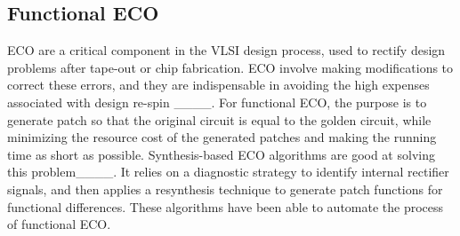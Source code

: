 \subsection{Functional ECO}
ECO are a critical component in the VLSI design process, used to rectify design problems after tape-out or chip fabrication. ECO involve making modifications to correct these errors, and they are indispensable in avoiding the high expenses associated with design re-spin ____.
For functional ECO, the purpose is to generate patch so that the original circuit is equal to the golden circuit, while minimizing the resource cost of the generated patches and making the running time as short as possible. Synthesis-based ECO algorithms are good at solving this problem____. It relies on a diagnostic strategy to identify internal rectifier signals, and then applies a resynthesis technique to generate patch functions for functional differences. These algorithms have been able to automate the process of functional ECO.


